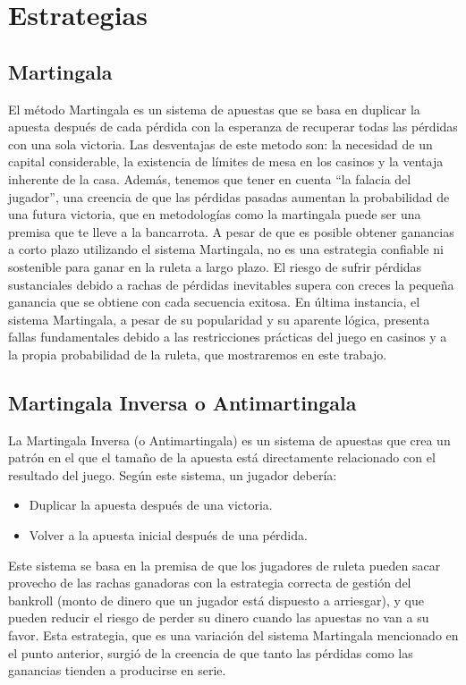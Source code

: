 \documentclass{article}
\begin{document}
\section{Estrategias}
\subsection{Martingala}
El método Martingala es un sistema de apuestas que se basa en duplicar la apuesta después de cada pérdida con la esperanza de recuperar todas las pérdidas con una sola victoria. 
Las desventajas de este metodo son: la necesidad de un capital considerable, la existencia de límites de mesa en los casinos y la ventaja inherente de la casa. Además, tenemos que tener en cuenta “la falacia del jugador”, una creencia de que las pérdidas pasadas aumentan la probabilidad de una futura victoria, que en metodologías como la martingala puede ser una premisa que te lleve a la bancarrota.
A pesar de que es posible obtener ganancias a corto plazo utilizando el sistema Martingala, no es una estrategia confiable ni sostenible para ganar en la ruleta a largo plazo. El riesgo de sufrir pérdidas sustanciales debido a rachas de pérdidas inevitables supera con creces la pequeña ganancia que se obtiene con cada secuencia exitosa. 
En última instancia, el sistema Martingala, a pesar de su popularidad y su aparente lógica, presenta fallas fundamentales debido a las restricciones prácticas del juego en casinos y a la propia probabilidad de la ruleta, que mostraremos en este trabajo.


\subsection{Martingala Inversa o Antimartingala}
La Martingala Inversa (o Antimartingala) es un sistema de apuestas que crea un patrón en el que el tamaño de la apuesta está directamente relacionado con el resultado del juego.
Según este sistema, un jugador debería:
\begin{itemize}
  \item Duplicar la apuesta después de una victoria.
  \item Volver a la apuesta inicial después de una pérdida.
\end{itemize}
Este sistema se basa en la premisa de que los jugadores de ruleta pueden sacar provecho de las rachas ganadoras con la estrategia correcta de gestión del bankroll (monto de dinero que un jugador está dispuesto a arriesgar), y que pueden reducir el riesgo de perder su dinero cuando las apuestas no van a su favor.
Esta estrategia, que es una variación del sistema Martingala mencionado en el punto anterior, surgió de la creencia de que tanto las pérdidas como las ganancias tienden a producirse en serie.
\end{document}
